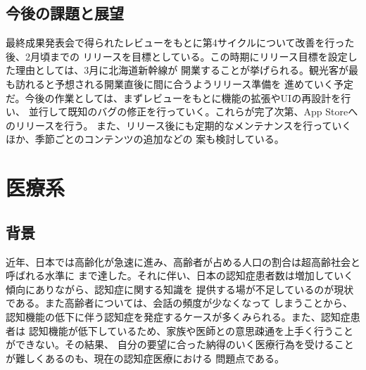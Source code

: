 \documentclass[twocolumn,draft]{jsarticle}
\begin{document}
\subsection{今後の課題と展望}
\begin{hissu}
最終成果発表会で得られたレビューをもとに第4サイクルについて改善を行った後、2月頃までの
リリースを目標としている。この時期にリリース目標を設定した理由としては、3月に北海道新幹線が
開業することが挙げられる。観光客が最も訪れると予想される開業直後に間に合うようリリース準備を
進めていく予定だ。今後の作業としては、まずレビューをもとに機能の拡張やUIの再設計を行い、
並行して既知のバグの修正を行っていく。これらが完了次第、App Storeへのリリースを行う。
また、リリース後にも定期的なメンテナンスを行っていくほか、季節ごとのコンテンツの追加などの
案も検討している。


\end{hissu}















\section{医療系}

\subsection{背景}
\begin{hissu}
近年、日本では高齢化が急速に進み、高齢者が占める人口の割合は超高齢社会と呼ばれる水準に
まで達した。それに伴い、日本の認知症患者数は増加していく傾向にありながら、認知症に関する知識を
提供する場が不足しているのが現状である。また高齢者については、会話の頻度が少なくなって
しまうことから、認知機能の低下に伴う認知症を発症するケースが多くみられる。また、認知症患者は
認知機能が低下しているため、家族や医師との意思疎通を上手く行うことができない。その結果、
自分の要望に合った納得のいく医療行為を受けることが難しくあるのも、現在の認知症医療における
問題点である。

\end{hissu}
\end{document}
